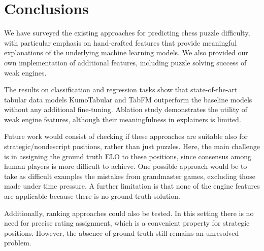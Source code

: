 \documentclass[sigconf,nonacm]{acmart}
\begin{document}

\section{Conclusions}

We have surveyed the existing approaches for predicting chess puzzle difficulty, with particular emphasis on hand-crafted features that provide meaningful explanations of the underlying machine learning models. We also provided our own implementation of additional features, including puzzle solving success of weak engines. 

The results on classification and regression tasks show that state-of-the-art tabular data models KumoTabular \cite{kumo} and TabFM \cite{tabfm} outperform the baseline models without any additional fine-tuning. Ablation study demonstrates the utility of weak engine features, although their meaningfulness in explainers is limited. 

Future work would consist of checking if these approaches are suitable also for strategic/nondescript positions, rather than just puzzles. Here, the main challenge is in assigning the ground truth ELO to these positions, since consensus among human players is more difficult to achieve. One possible approach would be to take as difficult examples the mistakes from grandmaster games, excluding those made under time pressure. A further limitation is that none of the engine features are applicable because there is no ground truth solution. 

Additionally, ranking approaches could also be tested. In this setting there is no need for precise rating assignment, which is a convenient property for strategic positions. However, the absence of ground truth still remains an unresolved problem. 




\appendix






\end{document}
